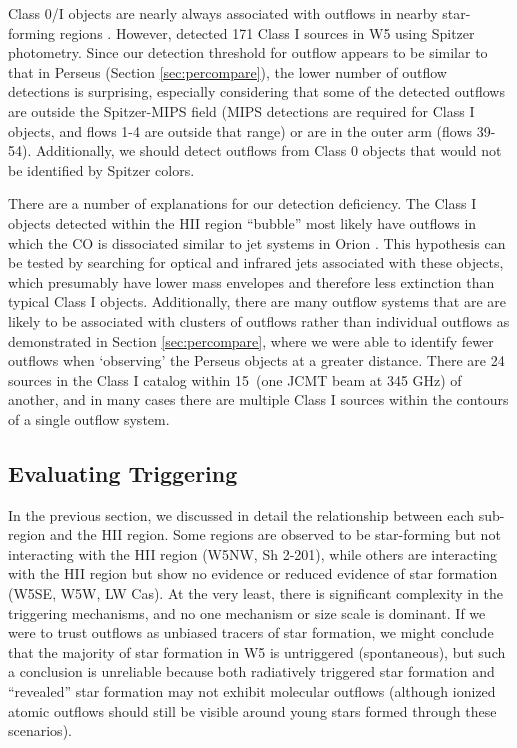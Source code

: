 Class 0/I objects are nearly always associated with outflows in nearby
star-forming regions \citep[e.g. Perseus][]{curtis2010,hatchell2007}.  However,
\citet{koenig:clustered:2008} detected 171 Class I sources in W5 using Spitzer
photometry.  Since our detection threshold for outflow appears to be similar to
that in Perseus (Section \ref{sec:percompare}), the lower number of outflow
detections is surprising, especially considering that some of the detected
outflows are outside the Spitzer-MIPS field (MIPS detections are required for
Class I objects, and flows 1-4 are outside that range) or are in the outer arm
(flows 39-54).  Additionally, we should detect outflows from Class 0
objects that would not be identified by Spitzer colors.

There are a number of explanations for our detection deficiency.  The Class I
objects detected within the HII region ``bubble'' most likely have outflows in
which the CO is dissociated similar to jet systems in Orion \citep[e.g.
HH46/47, a pc-scale flow in which CO is only visible very near the
protostar;][]{Chernin1991,Stanke1999}.  This hypothesis can be tested by
searching for optical and infrared jets associated with these objects, which
presumably have lower mass envelopes and therefore less extinction than
typical Class I objects.  Additionally, there are many outflow systems that are
are likely to be associated with clusters of outflows rather than individual
outflows as demonstrated in Section \ref{sec:percompare}, where we were able to identify
fewer outflows when `observing' the Perseus objects at a greater distance.  There
are 24 sources in the \citet{koenig:clustered:2008} Class I catalog within
15\arcsec\ (one JCMT beam at 345 GHz) of another, and in many cases there are
multiple \citet{koenig:clustered:2008} Class I sources within the contours of a
single outflow system.



\subsection{Evaluating Triggering}
In the previous section, we discussed in detail the relationship between each
sub-region and the HII region.  Some regions are observed to be star-forming
but not interacting with the HII region (W5NW, Sh 2-201), while others are
interacting with the HII region but show no evidence or reduced evidence of
star formation (W5SE, W5W, LW Cas).  At the very least, there is significant
complexity in the triggering mechanisms, and no one mechanism or size scale is
dominant.  If we were to trust outflows as unbiased tracers of star formation,
we might conclude that the majority of star formation in W5 is untriggered
(spontaneous), but such a conclusion is unreliable because both radiatively
triggered star formation and ``revealed'' star formation may not exhibit
molecular outflows (although ionized atomic outflows should still be visible
around young stars formed through these scenarios).

